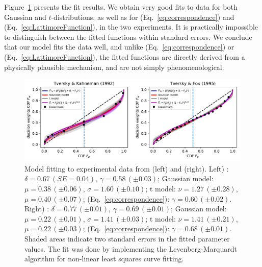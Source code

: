 \documentclass[a4paper, 12pt]{article}
\newcommand{\eref}[1]{(Eq.~\ref{eq:#1})}
\newcommand{\flabel}[1]{\label{fig:#1}}
\newcommand{\Fref}[1]{Figure~\ref{fig:#1}}
\begin{document}
\Fref{TK_TF_fit} presents the fit results. We obtain very good fits to data for both Gaussian and $t$-distributions, as well as for \eref{correspondence} and \eref{LattimoreFunction}, in the two experiments. It is practically impossible to distinguish between the fitted functions within standard errors. We conclude that our model fits the data well, and unlike \eref{correspondence} or \eref{LattimoreFunction}, the fitted functions are directly derived from a physically plausible mechanism, and are not simply phenomenological.

\begin{figure}[htb]
\centering
\includegraphics[width=1.0\textwidth]{./figs/TK_TF_curvefit.pdf}
\caption{Model fitting to experimental data from \cite{TverskyKahneman1992} (left) and \cite{TverskyFox1995} (right).
Left) \cite{LattimoreBakerWitte1992}: $\delta=0.67\,\left(SE = 0.04\right)$, $\gamma=0.58\,\left(\pm0.03\right)$; Gaussian model: $\mu=0.38\,\left(\pm0.06\right)$, $\sigma=1.60\,\left(\pm0.10\right)$; t model: $\nu=1.27\,\left(\pm0.28\right)$, $\mu=0.40\,\left(\pm0.07\right)$; \cite{TverskyKahneman1992} \eref{correspondence}: $\gamma=0.60\,\left(\pm0.02\right)$. Right) \cite{LattimoreBakerWitte1992}: $\delta=0.77\,\left(\pm0.01\right)$, $\gamma=0.69\,\left(\pm0.01\right)$; Gaussian model: $\mu=0.22\,\left(\pm0.01\right)$, $\sigma=1.41\,\left(\pm0.03\right)$; t model: $\nu=1.41\,\left(\pm0.21\right)$, $\mu=0.22\,\left(\pm0.03\right)$; \cite{TverskyKahneman1992} \eref{correspondence}: $\gamma=0.68\,\left(\pm0.01\right)$. Shaded areas indicate two standard errors in the fitted parameter values. The fit was done by implementing the Levenberg-Marquardt algorithm \cite{Levenberg1944} for non-linear least squares curve fitting.
}
\flabel{TK_TF_fit}
\end{figure}

\FloatBarrier
\end{document}
